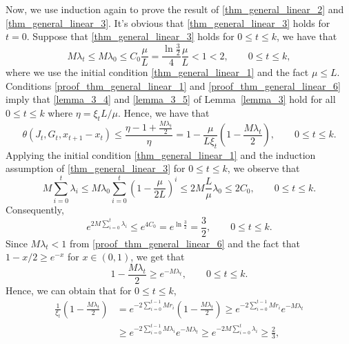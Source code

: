 \documentclass[11pt]{article}
\numberwithin{assumption}{section}
\numberwithin{remark}{section}
\numberwithin{theorem}{section}
\begin{document}
Now, we use induction again to prove the result of \eqref{thm_general_linear_2} and \eqref{thm_general_linear_3}. It's obvious that \eqref{thm_general_linear_3} holds for $t = 0$. Suppose that \eqref{thm_general_linear_3} holds for $0 \leq t \leq k$, we have that
\begin{equation}\label{proof_thm_general_linear_6}
M\lambda_t \leq M\lambda_0 \leq C_0\frac{\mu}{L} = \frac{\ln{\frac{3}{2}}}{4}\frac{\mu}{L} < 1 < 2, \qquad 0 \leq t \leq k,
\end{equation}
where we use the initial condition \eqref{thm_general_linear_1} and the fact $\mu \leq L$. Conditions \eqref{proof_thm_general_linear_1} and \eqref{proof_thm_general_linear_6} imply that \eqref{lemma_3_4} and \eqref{lemma_3_5} of Lemma~\ref{lemma_3} hold for all $0 \leq t \leq k$ where $\eta = \xi_t{L}/{\mu}$. Hence, we have that
\begin{equation}\label{proof_thm_general_linear_7}
    \theta(J_t, G_t, x_{t + 1} - x_{t}) \leq \frac{\eta - 1 + \frac{M\lambda_{t}}{2}}{\eta} = 1 - \frac{\mu}{L\xi_t}(1 - \frac{M\lambda_t}{2}), \qquad 0 \leq t \leq k.
\end{equation}
Applying the initial condition \eqref{thm_general_linear_1} and the induction assumption of \eqref{thm_general_linear_3} for $0 \leq t \leq k$, we observe that
\begin{equation}
M\sum_{i = 0}^{t}\lambda_i \leq M\lambda_0 \sum_{i = 0}^{t}(1 - \frac{\mu}{2L})^{i} \leq 2M\frac{L}{\mu}\lambda_0 \leq 2C_0, \qquad 0 \leq t \leq k.
\end{equation}
Consequently,
\begin{equation}\label{proof_thm_general_linear_8}
e^{2M\sum_{i = 0}^{t}\lambda_i} \leq e^{4C_0} = e^{\ln{\frac{3}{2}}} = \frac{3}{2}, \qquad 0 \leq t \leq k.
\end{equation}
Since $M\lambda_t < 1$ from \eqref{proof_thm_general_linear_6} and the fact that $1 - x/2 \geq e^{-x}$ for $x \in (0, 1)$, we get that
\begin{equation}\label{proof_thm_general_linear_9}
1 - \frac{M\lambda_t}{2} \geq e^{-M\lambda_t}, \qquad 0 \leq t \leq k.
\end{equation}
Hence, we can obtain that for $0 \leq t \leq k$,
\begin{equation}\label{proof_thm_general_linear_10}
\begin{split}
    \frac{1}{\xi_t}(1 - \frac{M\lambda_t}{2}) & = e^{-2\sum_{i = 0}^{t - 1}Mr_i}(1 - \frac{M\lambda_t}{2}) \geq e^{-2\sum_{i = 0}^{t - 1}Mr_i}e^{-M\lambda_t}\\
    & \geq e^{-2\sum_{i = 0}^{t - 1}M\lambda_i}e^{-M\lambda_t} \geq e^{-2M\sum_{i = 0}^{t}\lambda_i} \geq \frac{2}{3},
\end{split}
\end{equation}
\end{document}
